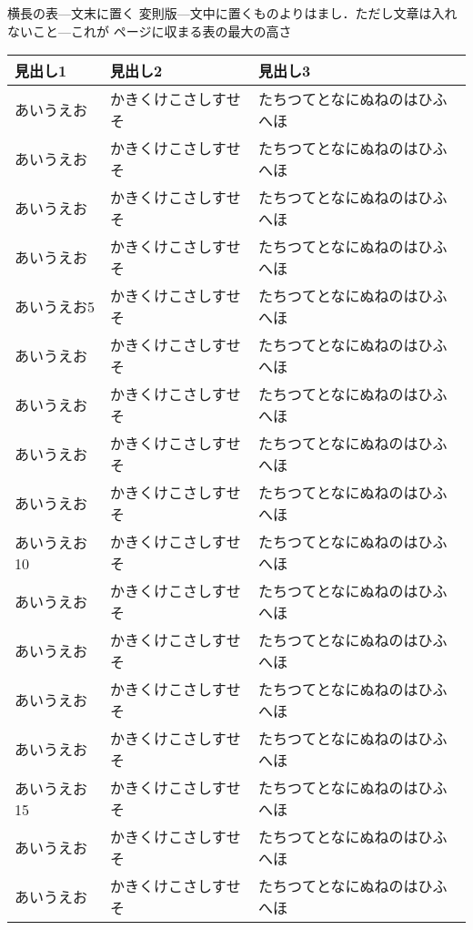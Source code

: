 \documentclass{jsce}
\makeatletter
\def\labelx#1#2{\@bsphack %
  \protected@write\@auxout{}%
         {\string\newlabel{#1}{{#2}{\thepage}}}%
  \@esphack}
\makeatother
\begin{document}
\begin{minipage}[c]{.95\textwidth}
\begin{center}
\addtocounter{table}{1} %
{\small
{\bf \tablename\nobreak\thetable} 横長の表---文末に置く
変則版---文中に置くものよりはまし．ただし文章は入れないこと---これが
ページに収まる表の最大の高さ
}\\[5mm]
\labelx{tab:landscape2}{\thetable} %
\begin{tabular}{|p{6cm}|p{8cm}|p{8cm}|} \hline
見出し1 & 見出し2 & 見出し3 \\ \hline\hline
あいうえお & かきくけこさしすせそ & たちつてとなにぬねのはひふへほ \\ \hline
あいうえお & かきくけこさしすせそ & たちつてとなにぬねのはひふへほ \\ \hline
あいうえお & かきくけこさしすせそ & たちつてとなにぬねのはひふへほ \\ \hline
あいうえお & かきくけこさしすせそ & たちつてとなにぬねのはひふへほ \\ \hline
あいうえお5 & かきくけこさしすせそ & たちつてとなにぬねのはひふへほ \\ \hline
あいうえお & かきくけこさしすせそ & たちつてとなにぬねのはひふへほ \\ \hline
あいうえお & かきくけこさしすせそ & たちつてとなにぬねのはひふへほ \\ \hline
あいうえお & かきくけこさしすせそ & たちつてとなにぬねのはひふへほ \\ \hline
あいうえお & かきくけこさしすせそ & たちつてとなにぬねのはひふへほ \\ \hline
あいうえお10 & かきくけこさしすせそ & たちつてとなにぬねのはひふへほ \\ \hline
あいうえお & かきくけこさしすせそ & たちつてとなにぬねのはひふへほ \\ \hline
あいうえお & かきくけこさしすせそ & たちつてとなにぬねのはひふへほ \\ \hline
あいうえお & かきくけこさしすせそ & たちつてとなにぬねのはひふへほ \\ \hline
あいうえお & かきくけこさしすせそ & たちつてとなにぬねのはひふへほ \\ \hline
あいうえお15 & かきくけこさしすせそ & たちつてとなにぬねのはひふへほ \\ \hline
あいうえお & かきくけこさしすせそ & たちつてとなにぬねのはひふへほ \\ \hline
あいうえお & かきくけこさしすせそ & たちつてとなにぬねのはひふへほ \\ \hline

\end{tabular}
\end{center}
\end{minipage}
\end{document}
